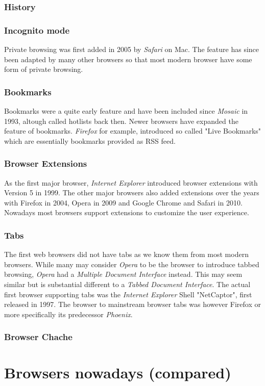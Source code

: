 \documentclass[runningheads]{llncs}
\begin{document}
			\subsubsection{History}
			\subsubsection{Incognito mode}
			Private browsing was first added in 2005 by \textit{Safari} on Mac. The feature has since been adapted by many other browsers so that most modern browser have some form of private browsing.
			\subsubsection{Bookmarks}
			Bookmarks were a quite early feature and have been included since \textit{Mosaic} in 1993, altough called hotlists back then. Newer browsers have expanded the feature of bookmarks. \textit{Firefox} for example, introduced so called "Live Bookmarks" which are essentially bookmarks provided as RSS feed.
			\subsubsection{Browser Extensions}
			As the first major browser, \textit{Internet Explorer} introduced browser extensions with Version 5 in 1999. The other major browsers also added extensions over the years with Firefox in 2004, Opera in 2009 and Google Chrome and Safari in 2010. Nowadays most browsers support extensions to customize the user experience.
			\subsubsection{Tabs}
			The first web browsers did not have tabs as we know them from most modern browsers. While many may consider \textit{Opera} to be the browser to introduce tabbed browsing, \textit{Opera} had a  \textit{Multiple Document Interface} instead. This may seem similar but is substantial different to a \textit{Tabbed Document Interface}. The actual first browser supporting tabs was the \textit{Internet Explorer} Shell "NetCaptor", first released in 1997. The browser to mainstream browser tabs was however Firefox or more specifically its predecessor \textit{Phoenix}.
			\subsubsection{Browser Chache}


	\section{Browsers nowadays (compared)}
\end{document}
